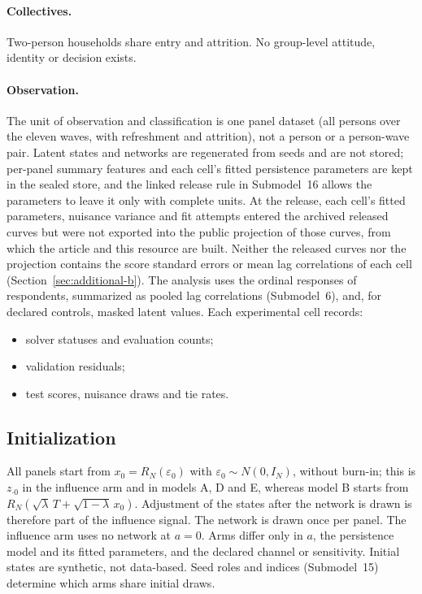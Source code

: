 \paragraph{Collectives.}
Two-person households share entry and attrition. No group-level attitude, identity or decision exists.

\paragraph{Observation.}
The unit of observation and classification is one panel dataset (all persons over the eleven waves, with refreshment and attrition), not a person or a person-wave pair. Latent states and networks are regenerated from seeds and are not stored; per-panel summary features and each cell's fitted persistence parameters are kept in the sealed store, and the linked release rule in Submodel~16 allows the parameters to leave it only with complete units. %
At the release, each cell's fitted parameters, nuisance variance and fit attempts entered the archived released curves but were not exported into the public projection of those curves, from which the article and this resource are built. Neither the released curves nor the projection contains the score standard errors or mean lag correlations of each cell (Section~\ref{sec:additional-b}).
The analysis uses the ordinal responses of respondents, summarized as pooled lag correlations (Submodel~6), and, for declared controls, masked latent values. Each experimental cell records:
\begin{itemize}
\item solver statuses and evaluation counts;
\item validation residuals;
\item test scores, nuisance draws and tie rates.
\end{itemize}

\subsection{Initialization}

All panels start from $x_0=R_N(\varepsilon_0)$ with $\varepsilon_0\sim N(0,I_N)$, without burn-in; this is $z_{\cdot0}$ in the influence arm and in models A, D and E, whereas model B starts from $R_N(\sqrt\lambda\,T+\sqrt{1-\lambda}\,x_0)$. Adjustment of the states after the network is drawn is therefore part of the influence signal. The network is drawn once per panel. The influence arm uses no network at $a=0$. Arms differ only in $a$, the persistence model and its fitted parameters, and the declared channel or sensitivity. Initial states are synthetic, not data-based. Seed roles and indices (Submodel~15) determine which arms share initial draws.

